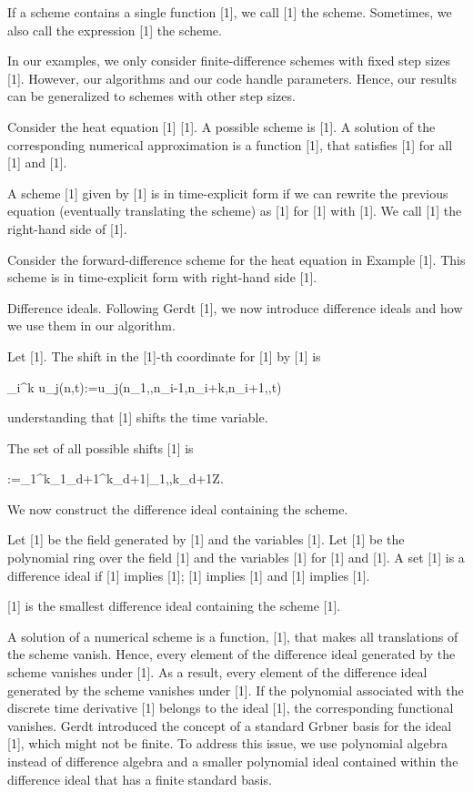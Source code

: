 \documentclass{article}
\begin{document}
{If a scheme contains a single function [1], we call [1] the scheme. Sometimes, we also call the expression [1] the scheme.

	In our examples, we only consider finite-difference schemes with fixed step sizes [1]. However, our algorithms and our code handle parameters. Hence, our results can be generalized to schemes with other step sizes.


	
Consider the heat equation	[1] [1].  A possible scheme is
[1].
A solution of the corresponding numerical approximation is a function [1], that satisfies
[1]
for all [1] and [1]. 



	A scheme [1] given by
	[1]
	is in {time-explicit form} if we can rewrite the previous equation (eventually translating the scheme) as
	[1]
	for [1]
	with [1]. We call [1] the right-hand side of [1].


	Consider the forward-difference scheme for the heat equation in Example [1]. 
	This scheme is in time-explicit form with right-hand side
	[1].

{Difference ideals.}
Following Gerdt [1], we now introduce difference ideals and how we use them in our algorithm.

	Let [1]. The {shift} in the [1]-th coordinate for [1] by [1] is
	
		_i^k u_j(n,t):=u_j(n_1,,n_{i-1},n_i+k,n_{i+1},,t)
	
	understanding that [1] shifts the time variable.


	The {set of all possible shifts} [1] is
	
		:=\sigma_1^{k_1}\cdots\sigma_{d+1}^{k_{d+1}}|_1,,k_{d+1}{{Z}}.

We now construct the difference ideal containing the scheme.

	
	Let [1] be the field generated by [1] and the variables [1]. Let [1] be the polynomial ring over the field [1] and the variables [1] for [1] and [1].
	A set [1] is a {difference ideal} if
	[1] implies [1];
	[1] implies [1] and
	[1] implies [1].


	[1] is the smallest difference ideal containing the scheme [1].



A solution of a numerical scheme is a function, [1], that makes all translations of the scheme vanish. Hence, every element of the difference ideal generated by the scheme vanishes under [1]. As a result, every element of the difference ideal generated by the scheme vanishes under [1]. If the polynomial associated with the discrete time derivative  [1]
belongs to the ideal [1], the corresponding functional vanishes. 
 Gerdt introduced the concept of a standard  Gr{}bner basis for the ideal [1], which might not be finite. To address this issue, we use polynomial algebra instead of difference algebra and a smaller polynomial ideal contained within the difference ideal that has a finite standard basis.
 
}
\end{document}
